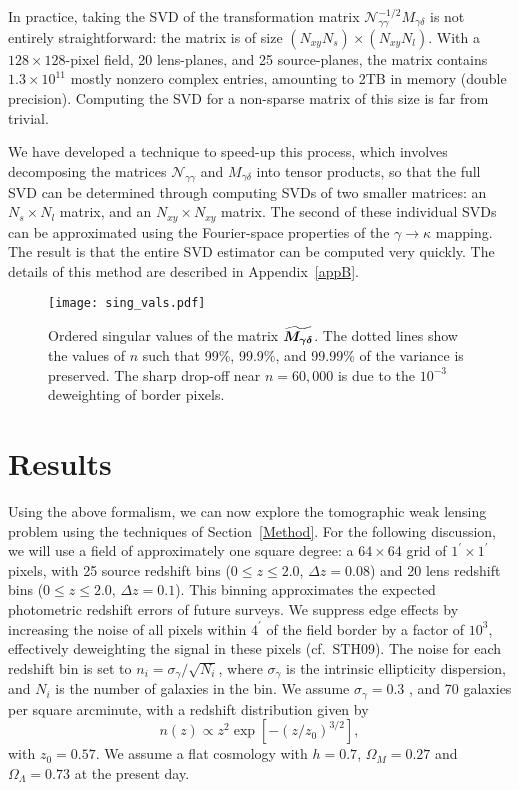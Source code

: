 In practice, taking the SVD of the transformation matrix 
$\mathcal{N}_{\gamma\gamma}^{-1/2}M_{\gamma\delta}$
is not entirely straightforward: the matrix is of size 
$(N_{xy}N_s) \times (N_{xy}N_l)$.
With a $128 \times 128$-pixel field, 20 lens-planes, and 25 source-planes,
the matrix contains $1.3\times 10^{11}$ mostly nonzero complex entries, 
amounting to 2TB in memory (double precision).  
Computing the SVD for a non-sparse matrix of this size is far from trivial.

We have developed a technique to speed-up this process, which involves decomposing
the matrices $\mathcal{N}_{\gamma\gamma}$ and $M_{\gamma\delta}$ into tensor
products, so that the full SVD can be determined through computing SVDs of
two smaller matrices: an $N_s\times N_l$ matrix, 
and an $N_{xy}\times N_{xy}$ matrix.
The second of these individual SVDs can be approximated using the
Fourier-space properties of the $\gamma\to\kappa$ mapping.  The result is
that the entire SVD estimator can be computed very quickly.  The details
of this method are described in Appendix~\ref{appB}.

\begin{figure*}[t] 
 \centering
 \texttt{[image: sing\_vals.pdf]}
 \caption{
   Ordered singular values of the matrix
   $\boldsymbol{\widetilde{M_{\gamma\delta}}}$.
   The dotted lines show the values of $n$ 
   such that 99\%, 99.9\%, and 99.99\% of the variance is preserved.
   The sharp drop-off near $n=60,000$ is due to the $10^{-3}$ 
   deweighting of border pixels.
   \label{fig_sing_vals}}
\end{figure*}

\section{Results}
\label{Results}
\label{Parameters}
Using the above formalism, we can now explore the
tomographic weak lensing problem using the 
techniques of Section~\ref{Method}.
For the following discussion, we will use a field of approximately 
one square degree: a $64 \times 64$ grid of
$1^\prime \times 1^\prime$ pixels, with 25 source redshift
bins ($0\le z\le 2.0$, $\Delta z = 0.08$) and 20 lens redshift bins
($0\le z\le 2.0$, $\Delta z = 0.1$).  This binning approximates the 
expected photometric redshift errors of future surveys.
We suppress edge effects by increasing
the noise of all pixels within $4^\prime$ of the field border
by a factor of $10^3$, effectively
deweighting the signal in these pixels (cf.\ STH09).  The noise
for each redshift bin is set to $n_i = \sigma_\gamma/\sqrt{N_i}$, where 
$\sigma_\gamma$ is the intrinsic ellipticity dispersion, and
$N_i$ is the number of galaxies in the bin.  We assume $\sigma_\gamma = 0.3$
\citep[based on the Hubble Deep Field image][]{Mellier99},
and 70 galaxies per square arcminute, with a redshift distribution given by
\begin{equation}
  \label{gal_z_dist}
  n(z) \propto z^2\exp{\left[-(z/z_0)^{3/2}\right]},
\end{equation}
with $z_0 = 0.57$.  We assume a flat cosmology with 
$h=0.7$, $\Omega_M = 0.27$  and $\Omega_\Lambda = 0.73$ at the present day.

